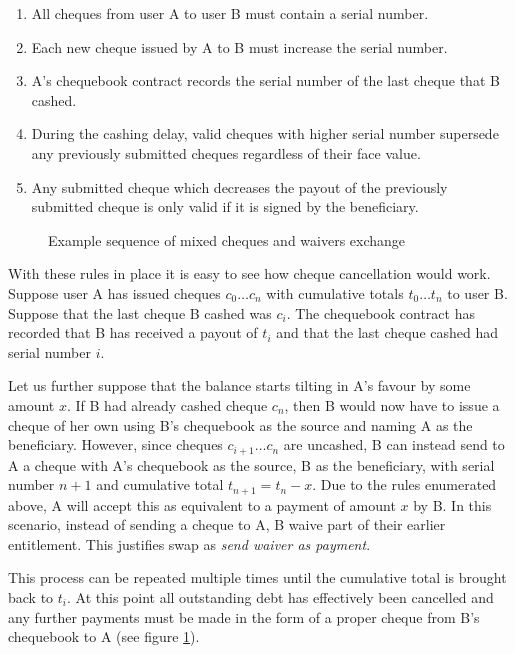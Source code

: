 \begin{enumerate}
    \item All cheques from user A to user B must contain a serial number.
    \item Each new cheque issued by A to B must increase the serial number.
    \item A's chequebook contract records the serial number of the last cheque that B cashed.
    \item During the cashing delay, valid cheques with higher serial number supersede any previously submitted cheques regardless of their face value.
    \item Any submitted cheque which decreases the payout of the previously submitted cheque is only valid if it is signed by the beneficiary.
\end{enumerate}


\begin{figure}[htbp]
\centering

\caption[Example sequence of mixed cheques and waivers exchange]{Example sequence of mixed cheques and waivers exchange}
\label{fig:waivers-diagram}
\end{figure}

With these rules in place it is easy to see how cheque cancellation would work. Suppose user A has issued cheques $c_0 \ldots c_n$ with cumulative totals $t_0 \ldots t_n$ to user B. Suppose that the last cheque B cashed was $c_i$. The chequebook contract has recorded that B has received a payout of $t_i$ and that the last cheque cashed had serial number $i$.

Let us further suppose that the balance starts tilting in A's favour by some amount $x$. If B had already cashed cheque $c_n$, then B would now have to issue a cheque of her own using B's chequebook as the source and naming A as the beneficiary. However, since cheques $c_{i+1} \ldots c_n$  are uncashed, B can instead send to A a cheque with A's chequebook as the source, B as the beneficiary, with serial number $n+1$ and cumulative total $t_{n+1} = t_n - x$. Due to the rules enumerated above, A will accept this as equivalent to a payment of amount $x$ by B.  In this scenario, instead of sending a cheque to A, B waive part of their earlier entitlement. This justifies swap as \emph{send waiver as payment}.

This process can be repeated multiple times until the cumulative total is brought back to $t_i$. At this point all outstanding debt has effectively been cancelled and any further payments must be made in the form of a proper cheque from B's chequebook to A (see figure \ref{fig:waivers-diagram}).


